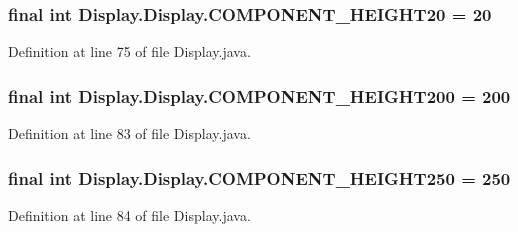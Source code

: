 \subsubsection[{C\+O\+M\+P\+O\+N\+E\+N\+T\+\_\+\+H\+E\+I\+G\+H\+T20}]{\setlength{\rightskip}{0pt plus 5cm}final int Display.\+Display.\+C\+O\+M\+P\+O\+N\+E\+N\+T\+\_\+\+H\+E\+I\+G\+H\+T20 = 20\hspace{0.3cm}{\ttfamily [static]}}\label{class_display_1_1_display_a205927f3e051ee88782c185b37c9e1d5}


Definition at line 75 of file Display.\+java.

\hypertarget{class_display_1_1_display_a880d1f86d07c77332fa8015e1b7a5145}{}
\subsubsection[{C\+O\+M\+P\+O\+N\+E\+N\+T\+\_\+\+H\+E\+I\+G\+H\+T200}]{\setlength{\rightskip}{0pt plus 5cm}final int Display.\+Display.\+C\+O\+M\+P\+O\+N\+E\+N\+T\+\_\+\+H\+E\+I\+G\+H\+T200 = 200\hspace{0.3cm}{\ttfamily [static]}}\label{class_display_1_1_display_a880d1f86d07c77332fa8015e1b7a5145}


Definition at line 83 of file Display.\+java.

\hypertarget{class_display_1_1_display_afbd2f610599f4393a4c30314c28ab73b}{}
\subsubsection[{C\+O\+M\+P\+O\+N\+E\+N\+T\+\_\+\+H\+E\+I\+G\+H\+T250}]{\setlength{\rightskip}{0pt plus 5cm}final int Display.\+Display.\+C\+O\+M\+P\+O\+N\+E\+N\+T\+\_\+\+H\+E\+I\+G\+H\+T250 = 250\hspace{0.3cm}{\ttfamily [static]}}\label{class_display_1_1_display_afbd2f610599f4393a4c30314c28ab73b}


Definition at line 84 of file Display.\+java.

